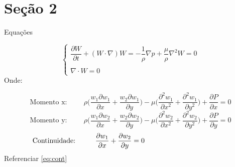 \section{Seção 2}
\begin{frame}{Equações}

\begin{equation*} 
\begin{cases}
 \dfrac{\partial W}{\partial t}	+	(W\cdot \nabla )W =-\dfrac{ 1}{\rho}\nabla p +
			 \dfrac{ \mu}{\rho}\nabla^2 W =0\\
\\
\nabla \cdot W =0
\end{cases}
\end{equation*}
Onde: 
\end{frame}
\begin{frame}
\begin{equation*} 
\text{Momento x:} \hspace{1cm} 
\rho \Big(	 \frac{w_1 \partial w_1}{\partial x}	+	\frac{ w_2\partial w_1}{\partial y}		\Big) -
\mu	 \Big(	 \frac{\partial^2w_1}{\partial x^2}	+	\frac{\partial^2w_1}{\partial y^2}	\Big) +
			 \frac{\partial P}{ \partial x} =0
\end{equation*}
\begin{equation*} 
\text{Momento y:} \hspace{1cm} 
\rho \Big(	 \frac{w_1 \partial w_2}{\partial x}	+	\frac{ w_2\partial w_2}{\partial y}		\Big) -
\mu	 \Big(	 \frac{\partial^2w_2}{\partial x^2}	+	\frac{\partial^2w_2}{\partial y^2}	\Big) +
			 \frac{\partial P}{ \partial y} =0
\end{equation*}
\begin{equation} \label{eq:cont}
\text{Continuidade:} \hspace{1cm} 
	 \frac{\partial w_1}{\partial x}	+	\frac{ \partial w_2}{\partial y}		 =0	\hspace{4.2cm}
\end{equation}
Referenciar \ref{eq:cont}
\end{frame}
